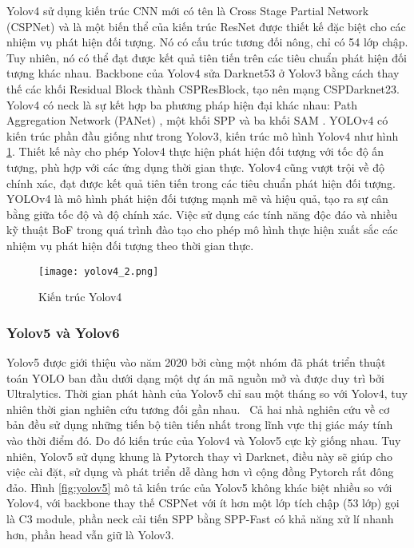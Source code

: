 \documentclass[../the.tex]{subfiles}
\begin{document}
{\fontsize{13}{12} \selectfont
Yolov4 sử dụng kiến trúc CNN mới có tên là Cross Stage Partial Network (CSPNet) \cite{wang2019cspnet} và là một biến thể của kiến trúc ResNet được thiết kế đặc biệt cho các nhiệm vụ phát hiện đối tượng. Nó có cấu trúc tương đối nông, chỉ có 54 lớp chập. Tuy nhiên, nó có thể đạt được kết quả tiên tiến trên các tiêu chuẩn phát hiện đối tượng khác nhau.
Backbone của Yolov4 sửa Darknet53 ở Yolov3 bằng cách thay thế các khối Residual Block thành CSPResBlock, tạo nên mạng CSPDarknet23.
Yolov4 có neck là sự kết hợp ba phương pháp hiện đại khác nhau: Path Aggregation Network (PANet) \cite{liu2018path}, một khối SPP \cite{He_2014} và ba khối SAM \cite{woo2018cbam}.
YOLOv4 có kiến trúc phần đầu giống như trong Yolov3, kiến trúc mô hình Yolov4 như hình \ref{fig:yolov4_2}.
Thiết kế này cho phép Yolov4 thực hiện phát hiện đối tượng với tốc độ ấn tượng, phù hợp với các ứng dụng thời gian thực. Yolov4 cũng vượt trội về độ chính xác, đạt được kết quả tiên tiến trong các tiêu chuẩn phát hiện đối tượng.
YOLOv4 là mô hình phát hiện đối tượng mạnh mẽ và hiệu quả, tạo ra sự cân bằng giữa tốc độ và độ chính xác. Việc sử dụng các tính năng độc đáo và nhiều kỹ thuật BoF trong quá trình đào tạo cho phép mô hình thực hiện xuất sắc các nhiệm vụ phát hiện đối tượng theo thời gian thực.
}

\begin{figure}[H]
	\centering
	\texttt{[image: yolov4\_2.png]}
	\caption{Kiến trúc Yolov4}
	\label{fig:yolov4_2}
\end{figure}

\subsubsection{Yolov5 và Yolov6}
{\fontsize{13}{12} \selectfont
	Yolov5 được giới thiệu vào năm 2020 bởi cùng một nhóm đã phát triển thuật toán YOLO ban đầu dưới dạng một dự án mã nguồn mở và được duy trì bởi Ultralytics.
	Thời gian phát hành của Yolov5 chỉ sau một tháng so với Yolov4, tuy nhiên thời gian nghiên cứu tương đối gần nhau. \
	Cả hai nhà nghiên cứu về cơ bản đều sử dụng những tiến bộ tiên tiến nhất trong lĩnh vực thị giác máy tính vào thời điểm đó. Do đó kiến trúc của Yolov4 và Yolov5 cực kỳ giống nhau.
	Tuy nhiên, Yolov5 sử dụng khung là Pytorch thay vì Darknet, điều này sẽ giúp cho việc cài đặt, sử dụng và phát triển dễ dàng hơn vì cộng đồng Pytorch rất đông đảo.
	Hình \ref{fig:yolov5} mô tả kiến trúc của Yolov5 không khác biệt nhiều so với Yolov4, với backbone thay thế CSPNet với ít hơn một lớp tích chập (53 lớp) gọi là C3 module, phần neck cải tiến SPP bằng SPP-Fast có khả năng xử lí nhanh hơn,
	phần head vẫn giữ là Yolov3.
}
\end{document}
